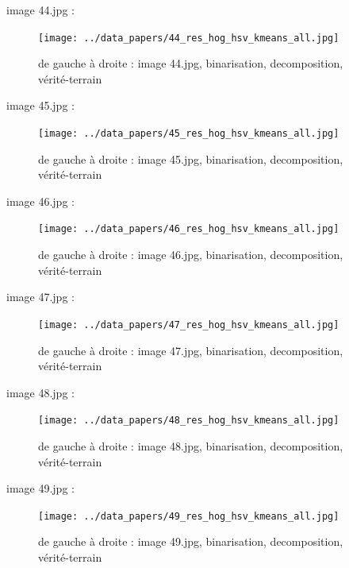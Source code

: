\documentclass{book}
\begin{document}
image 44.jpg : 
\begin{figure}[H]
\begin{center}
\texttt{[image: ../data\_papers/44\_res\_hog\_hsv\_kmeans\_all.jpg]}
\end{center}
\caption{de gauche à droite : image 44.jpg, binarisation, decomposition, vérité-terrain}
\label{44}
\end{figure}
\clearpage


image 45.jpg : 
\begin{figure}[H]
\begin{center}
\texttt{[image: ../data\_papers/45\_res\_hog\_hsv\_kmeans\_all.jpg]}
\end{center}
\caption{de gauche à droite : image 45.jpg, binarisation, decomposition, vérité-terrain}
\label{45}
\end{figure}
\clearpage


image 46.jpg : 
\begin{figure}[H]
\begin{center}
\texttt{[image: ../data\_papers/46\_res\_hog\_hsv\_kmeans\_all.jpg]}
\end{center}
\caption{de gauche à droite : image 46.jpg, binarisation, decomposition, vérité-terrain}
\label{46}
\end{figure}
\clearpage


image 47.jpg : 
\begin{figure}[H]
\begin{center}
\texttt{[image: ../data\_papers/47\_res\_hog\_hsv\_kmeans\_all.jpg]}
\end{center}
\caption{de gauche à droite : image 47.jpg, binarisation, decomposition, vérité-terrain}
\label{47}
\end{figure}
\clearpage


image 48.jpg : 
\begin{figure}[H]
\begin{center}
\texttt{[image: ../data\_papers/48\_res\_hog\_hsv\_kmeans\_all.jpg]}
\end{center}
\caption{de gauche à droite : image 48.jpg, binarisation, decomposition, vérité-terrain}
\label{48}
\end{figure}
\clearpage


image 49.jpg : 
\begin{figure}[H]
\begin{center}
\texttt{[image: ../data\_papers/49\_res\_hog\_hsv\_kmeans\_all.jpg]}
\end{center}
\caption{de gauche à droite : image 49.jpg, binarisation, decomposition, vérité-terrain}
\label{49}
\end{figure}
\clearpage
\end{document}
